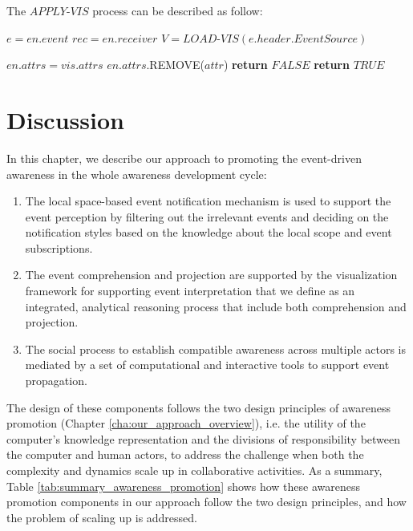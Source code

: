 The $APPLY\textrm{-}VIS$ process can be described as follow:
{\footnotesize
\begin{algorithm}
\begin{algorithmic}[1]
	\State $e = en.event$
	\State $rec = en.receiver$
	\State $V = LOAD\textrm{-}VIS(e.header.EventSource)$
	
					\State $en.attrs = vis.attrs$
				\Else
				    		\State $en.attrs$.REMOVE($attr$)
				    	\EndIf	
				    \EndFor	
				\EndIf
			\Else	
				\State \textbf{return} $FALSE$ 
			\EndIf
		\EndIf
	\EndFor
	\State \textbf{return} $TRUE$ 
\EndProcedure
\end{algorithmic}
\end{algorithm}
}
\section{Discussion} %
\label{sec:discussion}
In this chapter, we describe our approach to promoting the event-driven awareness in the whole awareness development cycle:

\begin{enumerate}
	\item The local space-based event notification mechanism is used to support the event perception by filtering out the irrelevant events and deciding on the notification styles based on the knowledge about the local scope and event subscriptions.
	\item The event comprehension and projection are supported by the visualization framework for supporting event interpretation that we define as an integrated, analytical reasoning process that include both comprehension and projection.
	\item The social process to establish compatible awareness across multiple actors is mediated by a set of computational and interactive tools to support event propagation.
\end{enumerate}

The design of these components follows the two design principles of awareness promotion (Chapter \ref{cha:our_approach_overview}), i.e. the utility of the computer's knowledge representation and the divisions of responsibility between the computer and human actors, to address the challenge when both the complexity and dynamics scale up in collaborative activities. As a summary, Table \ref{tab:summary_awareness_promotion} shows how these awareness promotion components in our approach follow the two design principles, and how the problem of scaling up is addressed.

